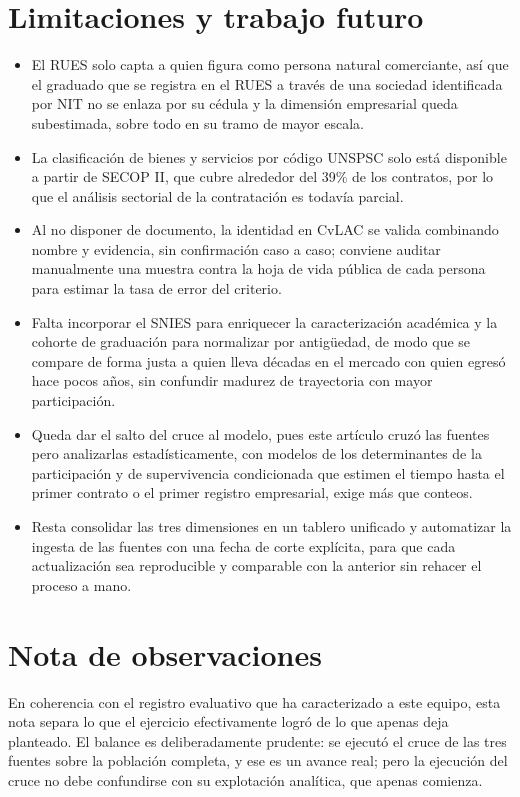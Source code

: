 \section{Limitaciones y trabajo futuro}

\begin{itemize}\setlength\itemsep{2pt}
  \item El RUES solo capta a quien figura como persona natural comerciante, así que el graduado que se registra en el RUES a través de una sociedad identificada por NIT no se enlaza por su cédula y la dimensión empresarial queda subestimada, sobre todo en su tramo de mayor escala.
  \item La clasificación de bienes y servicios por código UNSPSC solo está disponible a partir de SECOP II, que cubre alrededor del 39\% de los contratos, por lo que el análisis sectorial de la contratación es todavía parcial.
  \item Al no disponer de documento, la identidad en CvLAC se valida combinando nombre y evidencia, sin confirmación caso a caso; conviene auditar manualmente una muestra contra la hoja de vida pública de cada persona para estimar la tasa de error del criterio.
  \item Falta incorporar el SNIES para enriquecer la caracterización académica y la cohorte de graduación para normalizar por antigüedad, de modo que se compare de forma justa a quien lleva décadas en el mercado con quien egresó hace pocos años, sin confundir madurez de trayectoria con mayor participación.
  \item Queda dar el salto del cruce al modelo, pues este artículo cruzó las fuentes pero analizarlas estadísticamente, con modelos de los determinantes de la participación y de supervivencia condicionada que estimen el tiempo hasta el primer contrato o el primer registro empresarial, exige más que conteos.
  \item Resta consolidar las tres dimensiones en un tablero unificado y automatizar la ingesta de las fuentes con una fecha de corte explícita, para que cada actualización sea reproducible y comparable con la anterior sin rehacer el proceso a mano.
\end{itemize}

\section{Nota de observaciones}

En coherencia con el registro evaluativo que ha caracterizado a este equipo, esta nota separa lo que el ejercicio efectivamente logró de lo que apenas deja planteado. El balance es deliberadamente prudente: se ejecutó el cruce de las tres fuentes sobre la población completa, y ese es un avance real; pero la ejecución del cruce no debe confundirse con su explotación analítica, que apenas comienza.

